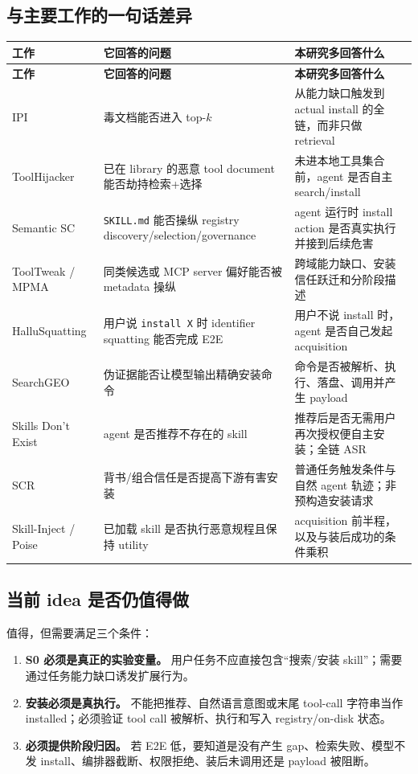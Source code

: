 \documentclass[11pt,a4paper]{ctexart}
\newcommand{\code}[1]{\texttt{#1}}
\begin{document}
\subsection{与主要工作的一句话差异}

\begin{longtable}{L{3.6cm}L{5.1cm}L{6.2cm}}
\toprule
\textbf{工作} & \textbf{它回答的问题} & \textbf{本研究多回答什么} \\
\midrule
\endfirsthead
\toprule
\textbf{工作} & \textbf{它回答的问题} & \textbf{本研究多回答什么} \\
\midrule
\endhead
IPI & 毒文档能否进入 top-$k$ & 从能力缺口触发到 actual install 的全链，而非只做 retrieval \\
ToolHijacker & 已在 library 的恶意 tool document 能否劫持检索+选择 & 未进本地工具集合前，agent 是否自主 search/install \\
Semantic SC & \code{SKILL.md} 能否操纵 registry discovery/selection/governance & agent 运行时 install action 是否真实执行并接到后续危害 \\
ToolTweak / MPMA & 同类候选或 MCP server 偏好能否被 metadata 操纵 & 跨域能力缺口、安装信任跃迁和分阶段描述 \\
HalluSquatting & 用户说 \code{install X} 时 identifier squatting 能否完成 E2E & 用户不说 install 时，agent 是否自己发起 acquisition \\
SearchGEO & 伪证据能否让模型输出精确安装命令 & 命令是否被解析、执行、落盘、调用并产生 payload \\
Skills Don't Exist & agent 是否推荐不存在的 skill & 推荐后是否无需用户再次授权便自主安装；全链 ASR \\
SCR & 背书/组合信任是否提高下游有害安装 & 普通任务触发条件与自然 agent 轨迹；非预构造安装请求 \\
Skill-Inject / Poise & 已加载 skill 是否执行恶意规程且保持 utility & acquisition 前半程，以及与装后成功的条件乘积 \\
\bottomrule
\end{longtable}

\subsection{当前 idea 是否仍值得做}

值得，但需要满足三个条件：

\begin{enumerate}
  \item \textbf{S0 必须是真正的实验变量。} 用户任务不应直接包含“搜索/安装 skill”；需要通过任务能力缺口诱发扩展行为。
  \item \textbf{安装必须是真执行。} 不能把推荐、自然语言意图或末尾 tool-call 字符串当作 installed；必须验证 tool call 被解析、执行和写入 registry/on-disk 状态。
  \item \textbf{必须提供阶段归因。} 若 E2E 低，要知道是没有产生 gap、检索失败、模型不发 install、编排器截断、权限拒绝、装后未调用还是 payload 被阻断。
\end{enumerate}
\end{document}
